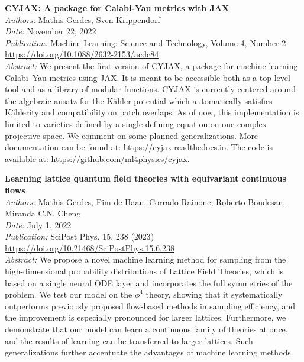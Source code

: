 \documentclass[11pt]{article}
\begin{document}
\textbf{CYJAX: A package for Calabi-Yau metrics with JAX}\\
\textit{Authors:} Mathis Gerdes, Sven Krippendorf\\
\textit{Date:} November 22, 2022 \\
\textit{Publication:} Machine Learning: Science and Technology, Volume 4, Number 2 \\
\href{https://doi.org/10.1088/2632-2153/acdc84}{https://doi.org/10.1088/2632-2153/acdc84}\\
\textit{Abstract:} We present the first version of CYJAX, a package for machine learning Calabi–Yau metrics using JAX. It is meant to be accessible both as a top-level tool and as a library of modular functions. CYJAX is currently centered around the algebraic ansatz for the Kähler potential which automatically satisfies Kählerity and compatibility on patch overlaps. As of now, this implementation is limited to varieties defined by a single defining equation on one complex projective space. We comment on some planned generalizations. More documentation can be found at: \href{https://cyjax.readthedocs.io}{https://cyjax.readthedocs.io}. The code is available at: \href{https://github.com/ml4physics/cyjax}{https://github.com/ml4physics/cyjax}.

\textbf{Learning lattice quantum field theories with equivariant continuous flows}\\
\textit{Authors:} Mathis Gerdes, Pim de Haan, Corrado Rainone, Roberto Bondesan, Miranda C.N. Cheng\\
\textit{Date:} July 1, 2022 \\
\textit{Publication:} SciPost Phys. 15, 238 (2023) \\
\href{https://doi.org/10.21468/SciPostPhys.15.6.238}{https://doi.org/10.21468/SciPostPhys.15.6.238}\\
\textit{Abstract:} We propose a novel machine learning method for sampling from the high-dimensional probability distributions of Lattice Field Theories, which is based on a single neural ODE layer and incorporates the full symmetries of the problem. We test our model on the $\phi^4$ theory, showing that it systematically outperforms previously proposed flow-based methods in sampling efficiency, and the improvement is especially pronounced for larger lattices. Furthermore, we demonstrate that our model can learn a continuous family of theories at once, and the results of learning can be transferred to larger lattices. Such generalizations further accentuate the advantages of machine learning methods.
\end{document}
